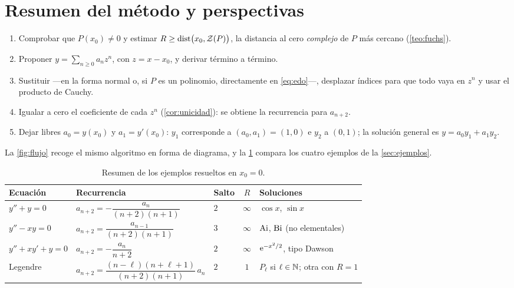\section{Resumen del método y perspectivas}\label{sec:resumen}

\begin{metodo}
\begin{enumerate}[label=\textcolor{ambar}{\bfseries\arabic*.}, leftmargin=1.6em]
  \item Comprobar que $P(x_0)\neq0$ y estimar
        $R\ge\operatorname{dist}\bigl(x_0,\mathcal Z(P)\bigr)$, la distancia al cero
        \emph{complejo} de $P$ más cercano (\cref{teo:fuchs}).
  \item Proponer $y=\sum_{n\ge0}a_nz^{n}$, con $z=x-x_0$, y derivar término
        a término.
  \item Sustituir ---en la forma normal o, si $P$ es un polinomio,
        directamente en \eqref{eq:edo}---, desplazar índices para que todo
        vaya en $z^{n}$ y usar el producto de Cauchy.
  \item Igualar a cero el coeficiente de cada $z^{n}$
        (\cref{cor:unicidad}): se obtiene la recurrencia para $a_{n+2}$.
  \item Dejar libres $a_0=y(x_0)$ y $a_1=y'(x_0)$: $y_1$ corresponde a
        $(a_0,a_1)=(1,0)$ e $y_2$ a $(0,1)$; la solución general es
        $y=a_0y_1+a_1y_2$.
\end{enumerate}
\end{metodo}

La \cref{fig:flujo} recoge el mismo algoritmo en forma de diagrama, y la
\cref{tab:resumen} compara los cuatro ejemplos de la \cref{sec:ejemplos}.

\begin{table}[!htb]
\centering
\caption{Resumen de los ejemplos resueltos en $x_0=0$.}
\label{tab:resumen}
\renewcommand{\arraystretch}{2.25}
\small
\begin{tabular}{@{}l l l c l@{}}
\toprule
\textcolor{cian}{\bfseries Ecuación} & \textcolor{cian}{\bfseries Recurrencia} &
\textcolor{cian}{\bfseries Salto} & \textcolor{cian}{\bfseries $R$} &
\textcolor{cian}{\bfseries Soluciones}\\
\midrule
$y''+y=0$ & $a_{n+2}=-\dfrac{a_n}{(n+2)(n+1)}$ & $2$ & $\infty$ & $\cos x$, $\sin x$\\
$y''-xy=0$ & $a_{n+2}=\dfrac{a_{n-1}}{(n+2)(n+1)}$ & $3$ & $\infty$ & $\operatorname{Ai}$, $\operatorname{Bi}$ (no elementales)\\
$y''+xy'+y=0$ & $a_{n+2}=-\dfrac{a_n}{n+2}$ & $2$ & $\infty$ & $\mathrm{e}^{-x^2/2}$, tipo Dawson\\
Legendre & $a_{n+2}=\dfrac{(n-\ell)(n+\ell+1)}{(n+2)(n+1)}\,a_n$ & $2$ & $1$ & $P_\ell$ si $\ell\in\mathbb{N}$; otra con $R=1$\\
\bottomrule
\end{tabular}
\end{table}

